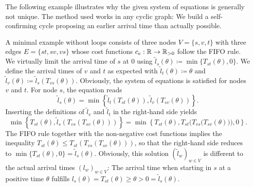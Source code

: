 The following example illustrates why the given system of equations is generally not unique.
The method used works in any cyclic graph: We build a self-confirming cycle proposing an earlier arrival time than actually possible.
\begin{example}
    A minimal example without loops consists of three nodes $V=\{ s, v, t \}$ with three edges $E=\{ st, sv, vs \}$ whose cost functions $c_e: \mathbb{R} \rightarrow \mathbb{R}_{>0}$ follow the FIFO rule.
    We virtually limit the arrival time of $s$ at $0$ using $\tilde l_s (\theta) \coloneqq \min\{ T_{st}(\theta), 0 \}$.
    We define the arrival times of $v$ and $t$ as expected with $\tilde l_t(\theta) \coloneqq \theta$ and $\tilde l_v(\theta) \coloneqq \tilde l_s(T_{vs}(\theta))$.
    Obviously, the system of equations is satisfied for nodes $v$ and $t$.
    For node $s$, the equation reads \[
        \tilde l_s(\theta) = \min\left\{ \tilde l_t(T_{st}(\theta)), \tilde l_v(T_{sv}(\theta)) \right\}. 
    \]
    Inserting the definitions of $\tilde l_v$ and $\tilde l_t$ in the right-hand side yields \[
        \min\left\{ T_{st}(\theta), \tilde l_s(T_{vs}(T_{sv}(\theta))) \right\}
        = \min \left\{ T_{st}(\theta), T_{st} \Big( T_{vs}\big(T_{sv}(\theta)\big) \Big), 0 \right\}.
    \]
    The FIFO rule together with the non-negative cost functions implies the inequality $T_{st}(\theta) \leq T_{st} ( T_{vs}(T_{sv}(\theta)))$, so that the right-hand side reduces to $\min\{ T_{st}(\theta), 0 \} = \tilde l_s(\theta)$.
    Obviously, this solution $(\tilde l_w)_{w\in V}$ is different to the actual arrival times $(l_w)_{w\in V}$: The arrival time when starting in $s$ at a positive time $\theta$ fulfills $l_s(\theta) = T_{st}(\theta) \geq \theta > 0 = \tilde l_s(\theta)$.
\end{example}